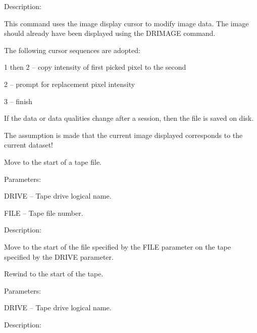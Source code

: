 \begin {description}
\begin {description}
\item Description:

This command uses the image display cursor to modify image data.
The image should already have been displayed using the DRIMAGE command.

The following cursor sequences are adopted:

\begin {description}
\item 1 then 2 -- copy intensity of first picked pixel to the second
\item 2 -- prompt for replacement pixel intensity
\item 3 -- finish
\end {description}

If the data or data qualities change after a session, then the file is
saved on disk.

The assumption is made that the current image displayed corresponds
to the current dataset!
\end {description}

\item [MTMOVE]
Move to the start of a tape file.

\begin {description}
\item Parameters:

\begin {description}
\item DRIVE -- Tape drive logical name.
\item FILE -- Tape file number.
\end {description}

\item Description:

Move to the start of the file specified by the FILE parameter on the 
tape specified by the DRIVE parameter.
\end {description}

\item [MTREW]
Rewind to the start of the tape.

\begin {description}
\item Parameters:

\begin {description}
\item DRIVE -- Tape drive logical name.
\end {description}

\item Description:


\end{description}
\end{description}
